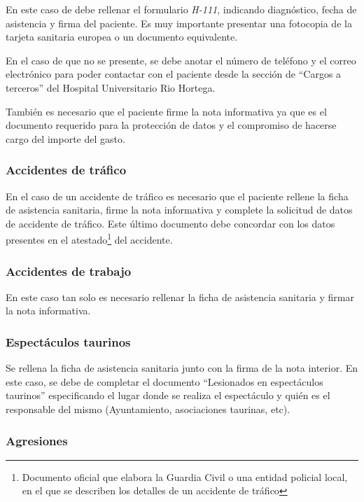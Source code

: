 En este caso de debe rellenar el formulario \textit{H-111}, indicando diagnóstico, fecha de asistencia y firma del paciente.
Es muy importante presentar una fotocopia de la tarjeta sanitaria europea o un documento equivalente.

En el caso de que no se presente, se debe anotar el número de teléfono y el correo electrónico para poder contactar con el paciente desde la sección de ``Cargos a terceros'' del Hospital Universitario Rio Hortega.

También es necesario que el paciente firme la nota informativa ya que es el documento requerido para la protección de datos y el compromiso de hacerse cargo del importe del gasto.

\subsubsection{Accidentes de tráfico}

En el caso de un accidente de tráfico es necesario que el paciente rellene la ficha de asistencia sanitaria, firme la nota informativa y complete la solicitud de datos de accidente de tráfico.
Este último documento debe concordar con los datos presentes en el atestado\footnote{Documento oficial que elabora la Guardia Civil o una entidad policial local, en el que se describen los detalles de un accidente de tráfico} del accidente.

\subsubsection{Accidentes de trabajo}

En este caso tan solo es necesario rellenar la ficha de asistencia sanitaria y firmar la nota informativa.

\subsubsection{Espectáculos taurinos}

Se rellena la ficha de asistencia sanitaria junto con la firma de la nota interior.
En este caso, se debe de completar el documento ``Lesionados en espectáculos taurinos'' especificando el lugar donde se realiza el espectáculo y quién es el responsable del mismo (Ayuntamiento, asociaciones taurinas, etc).

\subsubsection{Agresiones}

